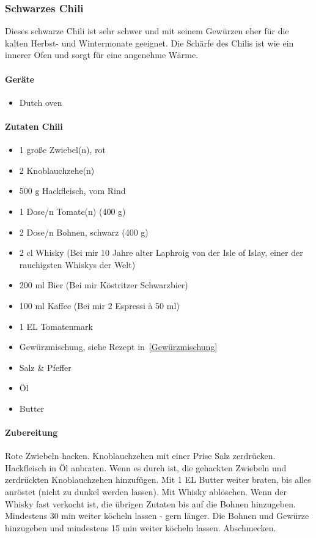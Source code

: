\subsubsection{Schwarzes Chili}
Dieses schwarze Chili ist sehr schwer und mit seinem Gewürzen eher für die 
kalten Herbst- und Wintermonate geeignet. Die Schärfe des Chilis ist wie ein 
innerer Ofen und sorgt für eine angenehme Wärme.

\paragraph{Geräte}

\begin{itemize}[noitemsep]
	\item Dutch oven
\end{itemize}

\paragraph{Zutaten Chili}

\begin{itemize}[noitemsep]
	\item 1 große Zwiebel(n), rot
	\item 2 Knoblauchzehe(n)
	\item 500 g Hackfleisch, vom Rind
	\item 1 Dose/n Tomate(n) (400 g)
	\item 2 Dose/n Bohnen, schwarz (400 g)
	\item 2 cl Whisky (Bei mir 10 Jahre alter Laphroig von der Isle of Islay, einer 
	der rauchigsten Whiskys der Welt)
	\item 200 ml Bier (Bei mir Köstritzer Schwarzbier)
	\item 100 ml Kaffee (Bei mir 2 Espressi à 50 ml)
	\item 1 EL	Tomatenmark
	\item Gewürzmischung, siehe Rezept in~\vref{Gewürzmischung}
	\item Salz \& Pfeffer
	\item Öl
	\item Butter
\end{itemize}

\paragraph{Zubereitung}

Rote Zwiebeln hacken. Knoblauchzehen mit einer Prise Salz zerdrücken. 
Hackfleisch in Öl anbraten. Wenn es durch ist, die gehackten Zwiebeln und 
zerdrückten 
Knoblauchzehen hinzufügen. Mit 1 EL Butter weiter braten, bis alles anröstet 
(nicht zu dunkel werden lassen). Mit Whisky ablöschen. Wenn der Whisky fast 
verkocht 
ist, die übrigen Zutaten bis auf die Bohnen hinzugeben. Mindestens 30 min 
weiter köcheln lassen - gern länger. Die Bohnen und Gewürze hinzugeben und 
mindestens
15 min weiter köcheln lassen. Abschmecken.


